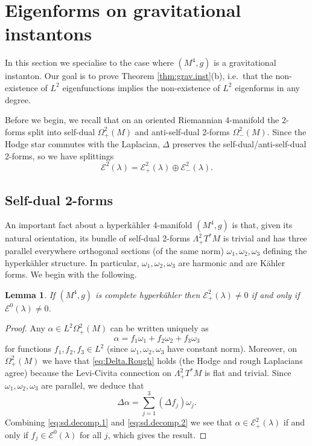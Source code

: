 \documentclass{article}
\newtheorem{lem}[thm]{Lemma}
\theoremstyle{definition}
\numberwithin{thm}{section}
\numberwithin{equation}{section}
\begin{document}
\section{Eigenforms on gravitational instantons}\label{sec:grav.inst}

In this section we specialise to the case where $(M^4,g)$ is a gravitational instanton.  Our goal is to prove Theorem \ref{thm:grav.inst}(b), i.e.~that the non-existence of $L^2$ eigenfunctions implies the non-existence of $L^2$ eigenforms in any degree.

Before we begin, we recall that on an oriented Riemannian 4-manifold the 2-forms split into self-dual $\Omega^2_+(M)$ and anti-self-dual 2-forms $\Omega^2_-(M)$.  Since the Hodge star commutes with the Laplacian, $\Delta$ preserves the self-dual/anti-self-dual 2-forms, so we have splittings
\begin{equation}\label{eq:E2+-}
    \mathcal{E}^2(\lambda)=\mathcal{E}^2_+(\lambda)\oplus\mathcal{E}^2_-(\lambda).
\end{equation}



\subsection{Self-dual 2-forms}

An important fact about a hyperk\"ahler 4-manifold $(M^4,g)$ is that, given its natural orientation, its bundle of self-dual 2-forms $\Lambda^2_+T^*M$ is trivial and has three parallel everywhere orthogonal sections (of the same norm) $\omega_1,\omega_2,\omega_3$ defining the hyperk\"ahler structure.  In particular, $\omega_1,\omega_2,\omega_3$ are harmonic and are K\"ahler forms.  We begin with the following.

\begin{lem}\label{lem:hk.ALE.sd}   
If $(M^4,g)$ is complete hyperk\"ahler then $\mathcal{E}^2_+(\lambda)\neq 0$ if and only if $\mathcal{E}^0(\lambda)\neq 0$.
\end{lem}

\begin{proof}
 Any $\alpha\in L^2\Omega^2_+(M)$ can be written uniquely as 
 \begin{equation}\label{eq:sd.decomp.1}
     \alpha=f_1\omega_1+f_2\omega_2+f_3\omega_3
 \end{equation}
 for functions $f_1,f_2,f_3\in L^2$ (since $\omega_1,\omega_2,\omega_3$ have constant norm).   
 Moreover, on $\Omega^2_+(M)$ we have that \eqref{eq:Delta.Rough} holds (the Hodge and rough Laplacians agree)  
 because the Levi-Civita connection on $\Lambda^2_+T^*M$ is flat and trivial.  Since $\omega_1,\omega_2,\omega_3$ are parallel, we deduce that
 \begin{equation}\label{eq:sd.decomp.2}
     \Delta\alpha= 
     \sum_{j=1}^3(\Delta f_j)\omega_j.
 \end{equation}
Combining \eqref{eq:sd.decomp.1} and \eqref{eq:sd.decomp.2} we see that  $\alpha\in\mathcal{E}^2_+(\lambda)$ if and only if $f_j\in\mathcal{E}^0(\lambda)$ for all $j$, which gives the result.
\end{proof}
\end{document}
